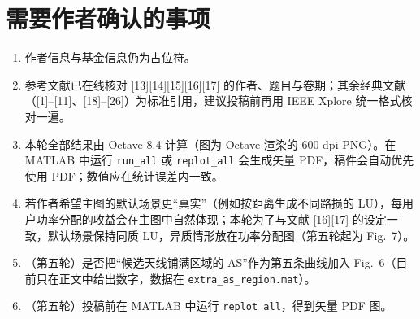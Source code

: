 \documentclass[11pt,a4paper]{ctexart}
\newcommand{\code}[1]{\texttt{#1}}
\begin{document}
\section{需要作者确认的事项}
\begin{enumerate}
\item 作者信息与基金信息仍为占位符。
\item 参考文献已在线核对 [13][14][15][16][17] 的作者、题目与卷期；其余经典文献（[1]--[11]、[18]--[26]）为标准引用，建议投稿前再用 IEEE Xplore 统一格式核对一遍。
\item 本轮全部结果由 Octave 8.4 计算（图为 Octave 渲染的 600 dpi PNG）。在 MATLAB 中运行 \code{run\_all} 或 \code{replot\_all} 会生成矢量 PDF，稿件会自动优先使用 PDF；数值应在统计误差内一致。
\item 若作者希望主图的默认场景更“真实”（例如按距离生成不同路损的 LU），每用户功率分配的收益会在主图中自然体现；本轮为了与文献 [16][17] 的设定一致，默认场景保持同质 LU，异质情形放在功率分配图（第五轮起为 Fig.~7）。
\item （第五轮）是否把“候选天线铺满区域的 AS”作为第五条曲线加入 Fig.~6（目前只在正文中给出数字，数据在 \code{extra\_as\_region.mat}）。
\item （第五轮）投稿前在 MATLAB 中运行 \code{replot\_all}，得到矢量 PDF 图。
\end{enumerate}
\end{document}
